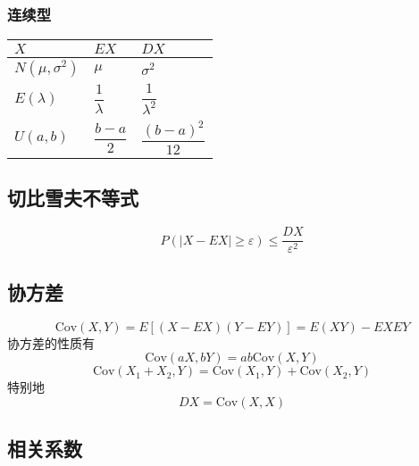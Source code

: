 \subsubsection{连续型}

\begin{table}[H]
  \renewcommand\arraystretch{2}
  \begin{tabular}{|l|l|l|}
    \hline
    $X$&$EX$&$DX$\\
    \hline
    $N(\mu,\sigma^{2})$&$\mu$&$\sigma^{2}$\\
    \hline
    $E(\lambda)$&$\dfrac{1}{\lambda}$&$\dfrac{1}{\lambda^{2}}$\\
    \hline
    $U(a,b)$&$\dfrac{b-a}{2}$&$\dfrac{(b-a)^{2}}{12}$\\
    \hline
  \end{tabular}
\end{table}

\subsection{切比雪夫不等式}

\begin{equation}
  \label{eq:9519029192103210}
  P \left( |X-EX| \geq \varepsilon \right) \leq \dfrac{DX}{\varepsilon^{2}}
\end{equation}

\subsection{协方差}

\begin{equation*}
  \mathrm{Cov}(X,Y)=E \left[ \left( X-EX \right) \left( Y-EY \right) \right] = E \left( XY \right) -EXEY
\end{equation*}
协方差的性质有
\begin{equation*}
  \mathrm{Cov}(aX,bY)=ab \mathrm{Cov}(X,Y)
\end{equation*}
\begin{equation*}
  \mathrm{Cov}(X_{1}+X_{2} ,Y) = \mathrm{Cov}(X_{1},Y) + \mathrm{Cov}(X_{2},Y)
\end{equation*}
特别地
\begin{equation*}
  DX=\mathrm{Cov}(X,X)
\end{equation*}

\subsection{相关系数}

